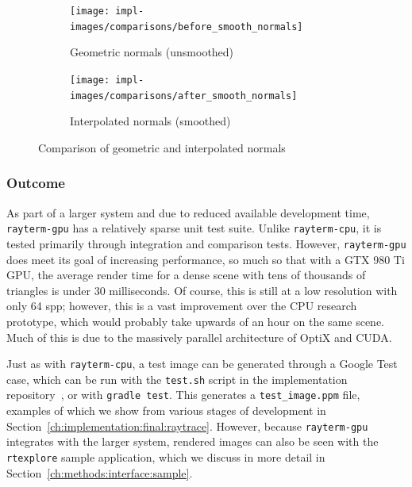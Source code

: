 \vspace{0.3em}
\begin{figure}[htb]
  \centering
  \begin{subfigure}[htb]{0.45\textwidth}
    \texttt{[image: impl-images/comparisons/before\_smooth\_normals]}
    \caption{Geometric normals (unsmoothed)}
\label{fig:rayterm-gpu_unsmoothed_normals}
  \end{subfigure}
  \hspace{1em}
  \begin{subfigure}[htb]{0.45\textwidth}
    \texttt{[image: impl-images/comparisons/after\_smooth\_normals]}
    \caption{Interpolated normals (smoothed)}
\label{fig:rayterm-gpu_smoothed_normals}
  \end{subfigure}
  \caption{Comparison of geometric and interpolated normals}
\label{fig:rayterm-gpu_smooth_normal_comparison}
\end{figure}

\subsubsection{Outcome}
\label{ch:methods:renderer:parallel:outcome}

As part of a larger system and due to reduced available development time, \texttt{rayterm-gpu} has a relatively sparse unit test suite.
Unlike \texttt{rayterm-cpu}, it is tested primarily through integration and comparison tests.
However, \texttt{rayterm-gpu} does meet its goal of increasing performance, so much so that with a GTX 980 Ti GPU, the average render time for a dense scene with tens of thousands of triangles is under 30 milliseconds.
Of course, this is still at a low resolution with only 64 spp; however, this is a vast improvement over the CPU research prototype, which would probably take upwards of an hour on the same scene.
Much of this is due to the massively parallel architecture of OptiX and CUDA.

Just as with \texttt{rayterm-cpu}, a test image can be generated through a Google Test~\cite{googletest} case, which can be run with the \texttt{test.sh} script in the implementation repository~\cite{raytermCpuImpl}, or with \texttt{gradle test}.
This generates a \texttt{test\_image.ppm} file, examples of which we show from various stages of development in Section~\ref{ch:implementation:final:raytrace}.
However, because \texttt{rayterm-gpu} integrates with the larger \name{} system, rendered images can also be seen with the \texttt{rtexplore} sample application, which we discuss in more detail in Section~\ref{ch:methods:interface:sample}.

